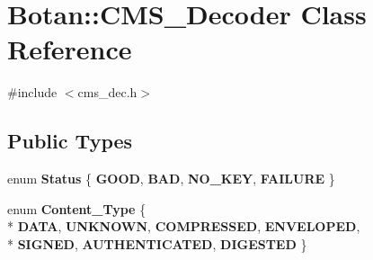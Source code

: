 \hypertarget{classBotan_1_1CMS__Decoder}{\section{Botan\-:\-:C\-M\-S\-\_\-\-Decoder Class Reference}
\label{classBotan_1_1CMS__Decoder}
}


{\ttfamily \#include $<$cms\-\_\-dec.\-h$>$}

\subsection*{Public Types}
\begin{DoxyCompactItemize}
\item 
enum {\bfseries Status} \{ {\bfseries G\-O\-O\-D}, 
{\bfseries B\-A\-D}, 
{\bfseries N\-O\-\_\-\-K\-E\-Y}, 
{\bfseries F\-A\-I\-L\-U\-R\-E}
 \}
\item 
enum {\bfseries Content\-\_\-\-Type} \{ \\*
{\bfseries D\-A\-T\-A}, 
{\bfseries U\-N\-K\-N\-O\-W\-N}, 
{\bfseries C\-O\-M\-P\-R\-E\-S\-S\-E\-D}, 
{\bfseries E\-N\-V\-E\-L\-O\-P\-E\-D}, 
\\*
{\bfseries S\-I\-G\-N\-E\-D}, 
{\bfseries A\-U\-T\-H\-E\-N\-T\-I\-C\-A\-T\-E\-D}, 
{\bfseries D\-I\-G\-E\-S\-T\-E\-D}
 \}
\end{DoxyCompactItemize}
